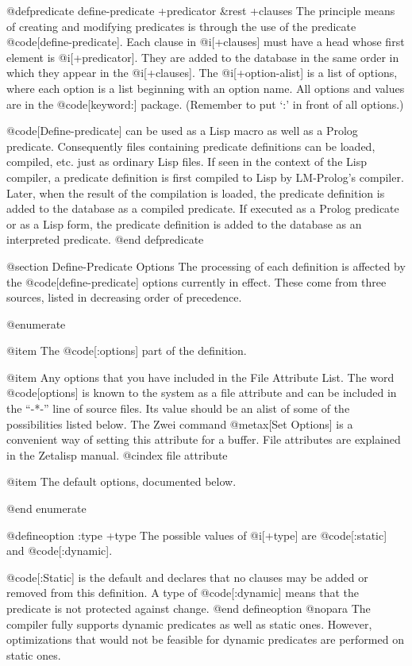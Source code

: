 {@defpredicate define-predicate +predicator &rest +clauses 
The principle means of creating and modifying predicates is through the
use of the predicate @code[define-predicate].  Each clause in
@i[+clauses] must have a head whose first element is
@i[+predicator].  They are added to the database in the same order in
which they appear in the @i[+clauses].  The @i[+option-alist]
is a list of options, where each option is a list beginning with an
option name.  All options and values are in the @code[keyword:]
package.  (Remember to put `:' in front of all options.)

@code[Define-predicate] can be used as a Lisp macro as well as a
Prolog predicate.  Consequently files containing predicate definitions
can be loaded, compiled, etc. just as ordinary Lisp files.  If seen in
the context of the Lisp compiler, a predicate definition is first
compiled to Lisp by LM-Prolog's compiler. Later, when the result of
the compilation is loaded, the predicate definition is added to the
database as a compiled predicate.  If executed as a Prolog predicate
or as a Lisp form, the predicate definition is added to the database
as an interpreted predicate.  
@end defpredicate

@section Define-Predicate Options
The processing of each definition is affected by the
@code[define-predicate] options currently in effect.  These come from
three sources, listed in decreasing order of precedence.

@enumerate

@item The @code[:options] part of the definition.

@item Any options that you have included in the File Attribute List. 
The word @code[options] is known to the system as a file attribute and
can be included in the ``-*-'' line of source files. Its value should
be an alist of some of the possibilities listed below.  The Zwei
command @metax[Set Options] is a convenient way of setting this
attribute for a buffer.  File attributes are explained in the Zetalisp
manual.
@cindex file attribute

@item The default options, documented below.

@end enumerate

@defineoption :type +type
The possible values of @i[+type] are @code[:static] and @code[:dynamic].

@code[:Static] is the default and declares that no clauses may be added or removed
from this definition.
A type of @code[:dynamic] means that the predicate is not 
protected against change.
@end defineoption
@nopara
The compiler fully supports dynamic
predicates as well as static ones.
However, optimizations that would not
be feasible for dynamic predicates are performed on static ones.

}
